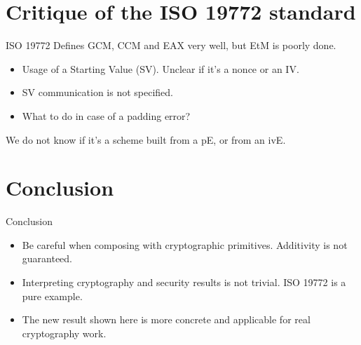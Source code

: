 \documentclass[11pt]{beamer}
\begin{document}
\section{Critique of the ISO 19772 standard}
\begin{frame}{ISO 19772}
Defines GCM, CCM and EAX very well, but EtM is poorly done.
\begin{itemize}
\item Usage of a Starting Value (SV). Unclear if it's a nonce or an IV.
\item SV communication is not specified.
\item What to do in case of a padding error?
\end{itemize}

We do not know if it's a scheme built from a pE, or from an ivE.
\end{frame}

{ %
    \begin{frame}[plain]
     \end{frame}
}

\section{Conclusion}
\begin{frame}{Conclusion}
\begin{itemize}
\item Be careful when composing with cryptographic primitives. Additivity is not guaranteed.
\item Interpreting cryptography and security results is not trivial. ISO 19772 is a pure example.
\item The new result shown here is more concrete and applicable for real cryptography work.
\end{itemize}
\end{frame}
\end{document}
